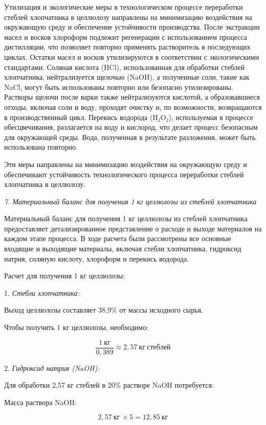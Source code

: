 \begin{multicols}{2}
Утилизация и экологические меры в технологическом процессе переработки
стеблей хлопчатника в целлюлозу направлены на минимизацию воздействия на
окружающую среду и обеспечение устойчивости производства. После
экстракции масел и восков хлороформ подлежит регенерации с
использованием процесса дистилляции, что позволяет повторно применять
растворитель в последующих циклах. Остатки масел и восков утилизируются
в соответствии с экологическими стандартами. Соляная кислота (HCl),
использованная для обработки стеблей хлопчатника, нейтрализуется щелочью
(NaOH), а полученные соли, такие как NaCl, могут быть использованы
повторно или безопасно утилизированы. Растворы щелочи после варки также
нейтрализуются кислотой, а образовавшиеся отходы, включая соли и воду,
проходят очистку и, по возможности, возвращаются в производственный
цикл. Перекись водорода (H₂O₂), используемая в процессе обесцвечивания,
разлагается на воду и кислород, что делает процесс безопасным для
окружающей среды. Вода, полученная в результате разложения, может быть
использована повторно.

Эти меры направлены на минимизацию воздействия на окружающую среду и
обеспечивают устойчивость технологического процесса переработки стеблей
хлопчатника в целлюлозу.

\emph{7. Материальный баланс для получения 1 кг целлюлозы из стеблей
хлопчатника}

Материальный баланс для получения 1 кг целлюлозы из стеблей хлопчатника
предоставляет детализированное представление о расходе и выходе
материалов на каждом этапе процесса. В ходе расчета были рассмотрены все
основные входящие и выходящие материалы, включая стебли хлопчатника,
гидроксид натрия, соляную кислоту, хлороформ и перекись водорода.

Расчет для получения 1 кг целлюлозы:

1. \emph{Стебли хлопчатника:}

Выход целлюлозы составляет 38,9\% от массы исходного сырья.

Чтобы получить 1 кг целлюлозы, необходимо:

\[\frac{1\ кг}{0,389} \approx 2,57\ кг\ стеблей\]

2. \emph{Гидроксид натрия (NaOH):}

Для обработки 2,57 кг стеблей в 20\% растворе NaOH потребуется:

Масса раствора NaOH:

\[2,57\ кг\  \times 5 = 12,85\ кг\]


\end{multicols}
